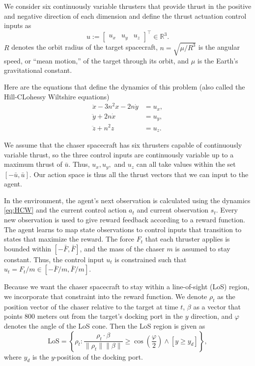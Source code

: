 \documentclass[12pt]{article}
\begin{document}
We consider six continuously variable thrusters that provide thrust in the positive and negative direction of each dimension and define the thrust actuation control inputs as 
\[
u := \begin{bmatrix} u_x & u_y & u_z \end{bmatrix}^\top \in \mathbb{R}^3.
\]
$R$ denotes the orbit radius of the target spacecraft, $n = \sqrt{\mu / R^3}$ is the angular speed, or “mean motion,” of the target through its orbit, and $\mu$ is the Earth’s gravitational constant.

Here are the equations that define the dynamics of this problem (also called the Hill-CLohessy Wiltshire equations)
\begin{equation}
\begin{aligned}
\ddot{x} - 3n^2 x - 2n \dot{y} &= u_x, \\
\ddot{y} + 2n \dot{x} &= u_y, \\
\ddot{z} + n^2 z &= u_z.
\end{aligned}
\tag{2}
\end{equation}

We assume that the chaser spacecraft has six thrusters capable of continuously variable thrust, so the three control inputs are continuously variable up to a maximum thrust of $\bar{u}$. Thus, $u_x, u_y,$ and $u_z$
can all take values within the set $[-\bar{u}, \bar{u}]$.
Our action space is thus all the thrust vectors that we can input to the agent.

In the environment, the agent’s next observation is calculated using the dynamics \eqref{eq:HCW} and the
current control action $a_t$ and current observation $s_t$. Every new observation is used to give reward
feedback according to a reward function. The agent learns to map state observations to control
inputs that transition to states that maximize the reward. The force $F_t$ that each thruster applies is
bounded within $[-\bar{F}, \bar{F}]$, and the mass of the chaser $m$ is assumed to stay constant. Thus, the
control input $u_t$ is constrained such that $u_t = F_t/m \in [-\bar{F}/m, \bar{F}/m]$.

Because we want the chaser spacecraft to stay within a line-of-sight (LoS) region, we incorporate that constraint into
the reward function. We denote $\rho_t$ as the position vector of the chaser relative to the target at time $t$, $\beta$ as a vector that points 800 meters out from the target’s docking port in the $y$ direction, and $\varphi$
denotes the angle of the LoS cone. Then the LoS region is given as
\[
\text{LoS} = \left\{ \rho_t : \frac{\rho_t \cdot \beta}{\|\rho_t\|\|\beta\|} \geq \cos\left(\frac{\varphi}{2}\right) \wedge [y \geq y_d] \right\},
\]
where $y_d$ is the $y$-position of the docking port. 
\end{document}
